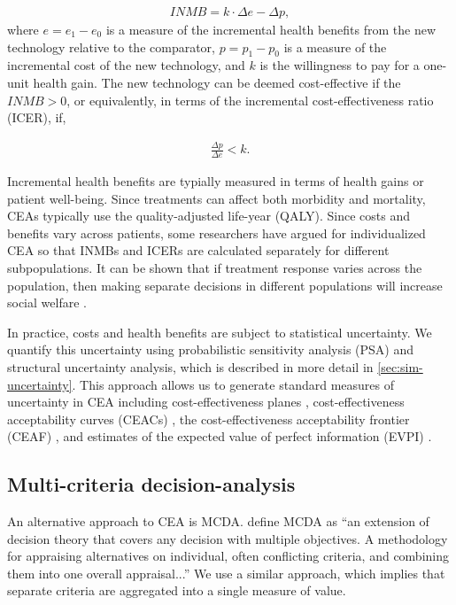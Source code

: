 \documentclass[11pt,final,fleqn]{article}
\theoremstyle{plain}
\begin{document}
\begin{align}
INMB = k \cdot \Delta e - \Delta p, 
\end{align}
where $e = e_1 - e_0$ is a measure of the incremental health benefits from the new technology relative to the comparator, $p = p_1 - p_0$ is a measure of the incremental cost of the new technology, and $k$ is the willingness to pay for a one-unit health gain. The new technology can be deemed cost-effective if the $INMB > 0$, or equivalently, in terms of the incremental cost-effectiveness ratio (ICER), if,

\begin{align}
\frac{\Delta p}{\Delta e} < k.
\end{align}

Incremental health benefits are typially measured in terms of health gains or patient well-being. Since treatments can affect both morbidity and mortality, CEAs typically use the quality-adjusted life-year (QALY). Since costs and benefits vary across patients, some researchers have argued for individualized CEA \citep{basu2007value, ioannidis2011individualized, espinoza2014value} so that INMBs and ICERs are calculated separately for different subpopulations. It can be shown that if treatment response varies across the population, then making separate decisions in different populations will increase social welfare \citep{basu2007value}.

In practice, costs and health benefits are subject to statistical uncertainty. We quantify this uncertainty using probabilistic sensitivity analysis (PSA) and structural uncertainty analysis, which is described in more detail in \autoref{sec:sim-uncertainty}. This approach allows us to generate standard measures of uncertainty in CEA including cost-effectiveness planes \citep{black1990plane, barton2008optimal}, cost-effectiveness acceptability curves (CEACs) \citep{van1994costs, briggs1999bayesian, fenwick2001representing, barton2008optimal}, the cost-effectiveness acceptability frontier (CEAF) \citep{barton2008optimal}, and estimates of the expected value of perfect information (EVPI) \citep{fenwick2001representing, barton2008optimal}.

\subsection{Multi-criteria decision-analysis}
An alternative approach to CEA is MCDA. \citet{keeney1993decisions} define MCDA as ``an extension of decision theory that covers any decision with multiple objectives. A methodology for appraising alternatives on individual, often conflicting criteria, and combining them into one overall appraisal...'' We use a similar approach, which implies that separate criteria are aggregated into a single measure of value.
\end{document}
